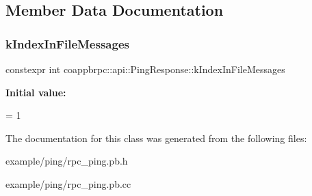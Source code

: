 \subsection{Member Data Documentation}
\mbox{\label{classcoappbrpc_1_1api_1_1PingResponse_ad5a3d40c2849a613c206a2e27c622fde}} 
\subsubsection{\texorpdfstring{k\+Index\+In\+File\+Messages}{kIndexInFileMessages}}
{\footnotesize\ttfamily constexpr int coappbrpc\+::api\+::\+Ping\+Response\+::k\+Index\+In\+File\+Messages\hspace{0.3cm}{\ttfamily [static]}}

{\bfseries Initial value\+:}
\begin{DoxyCode}
=
    1
\end{DoxyCode}


The documentation for this class was generated from the following files\+:\begin{DoxyCompactItemize}
\item 
example/ping/rpc\+\_\+ping.\+pb.\+h\item 
example/ping/rpc\+\_\+ping.\+pb.\+cc\end{DoxyCompactItemize}

